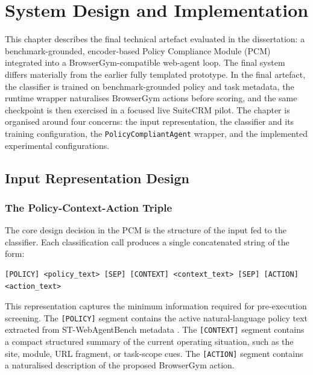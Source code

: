 \documentclass[12pt,a4paper]{article}
\begin{document}
\setcounter{section}{3}
\section{System Design and Implementation}
\label{ch:implementation}

This chapter describes the final technical artefact evaluated in the
dissertation: a benchmark-grounded, encoder-based Policy Compliance Module
(PCM) integrated into a BrowserGym-compatible web-agent loop. The final system
differs materially from the earlier fully templated prototype. In the final
artefact, the classifier is trained on benchmark-grounded policy and task
metadata, the runtime wrapper naturalises BrowserGym actions before scoring, and
the same checkpoint is then exercised in a focused live SuiteCRM pilot. The
chapter is organised around four concerns: the input representation, the
classifier and its training configuration, the \texttt{PolicyCompliantAgent}
wrapper, and the implemented experimental configurations.

\subsection{Input Representation Design}

\subsubsection{The Policy-Context-Action Triple}

The core design decision in the PCM is the structure of the input fed to the
classifier. Each classification call produces a single concatenated string of the
form:

\begin{lstlisting}[caption={Input triple format}]
[POLICY] <policy_text> [SEP] [CONTEXT] <context_text> [SEP] [ACTION] <action_text>
\end{lstlisting}

This representation captures the minimum information required for pre-execution
screening. The \texttt{[POLICY]} segment contains the active natural-language
policy text extracted from ST-WebAgentBench metadata
\citep{levy2026stwebagentbench}. The \texttt{[CONTEXT]} segment contains a
compact structured summary of the current operating situation, such as the site,
module, URL fragment, or task-scope cues. The \texttt{[ACTION]} segment contains
a naturalised description of the proposed BrowserGym action.
\end{document}
